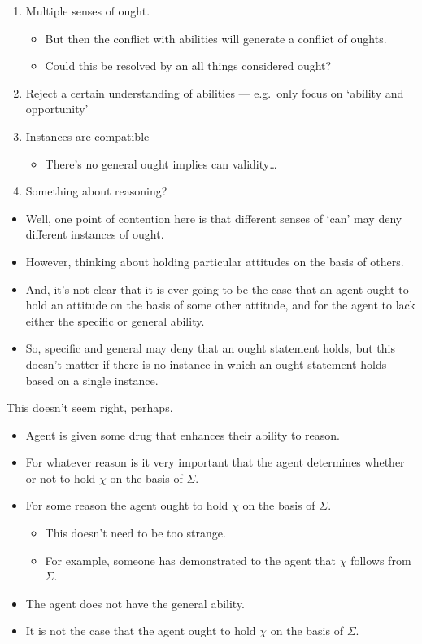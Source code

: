 \documentclass[10pt]{article}
\begin{document}
\begin{enumerate}
\item Multiple senses of ought.
  \begin{itemize}
  \item But then the conflict with abilities will generate a conflict of oughts.
  \item Could this be resolved by an all things considered ought?
  \end{itemize}
\item Reject a certain understanding of abilities --- e.g.\ only focus on `ability and opportunity'
\item Instances are compatible
  \begin{itemize}
  \item There's no general ought implies can validity\dots
  \end{itemize}
\item Something about reasoning?
\end{enumerate}

\begin{itemize}
\item Well, one point of contention here is that different senses of `can' may deny different instances of ought.
\item However, thinking about holding particular attitudes on the basis of others.
\item And, it's not clear that it is ever going to be the case that an agent ought to hold an attitude on the basis of some other attitude, and for the agent to lack either the specific or general ability.
\item So, specific and general may deny that an ought statement holds, but this doesn't matter if there is no instance in which an ought statement holds based on a single instance.
\end{itemize}

This doesn't seem right, perhaps.

\begin{itemize}
\item Agent is given some drug that enhances their ability to reason.
\item For whatever reason is it very important that the agent determines whether or not to hold \(\chi\) on the basis of \(\Sigma\).
\item For some reason the agent ought to hold \(\chi\) on the basis of \(\Sigma\).
  \begin{itemize}
  \item This doesn't need to be too strange.
  \item For example, someone has demonstrated to the agent that \(\chi\) follows from \(\Sigma\).
  \end{itemize}
\item The agent does not have the general ability.
\item It is not the case that the agent ought to hold \(\chi\) on the basis of \(\Sigma\).
\end{itemize}
\end{document}
